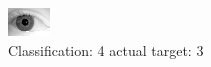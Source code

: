 \begin{figure}[h!]
\begin{center}
\includegraphics[width=0.60\columnwidth]{figures/ID2120_class_4_target_3.png}
\end{center}
\caption{ Classification: 4 actual target: 3}
\label{fig:ID2120_class_4_target_3}
\end{figure}

